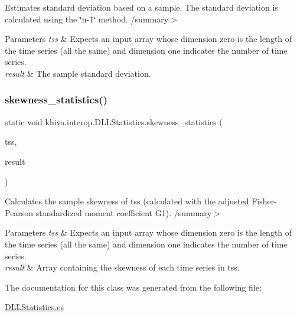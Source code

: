 Estimates standard deviation based on a sample. The standard deviation is calculated using the \char`\"{}n-\/1\char`\"{} method. /summary$>$ 
\begin{DoxyParams}{Parameters}
{\em tss} & Expects an input array whose dimension zero is the length of the time series (all the same) and dimension one indicates the number of time series.\\
\hline
{\em result} & The sample standard deviation.\\
\hline
\end{DoxyParams}


\mbox{\label{classkhiva_1_1interop_1_1_d_l_l_statistics_a8b1aee0f04bf7185e91460e4b861f8eb}} 
\subsubsection{\texorpdfstring{skewness\+\_\+statistics()}{skewness\_statistics()}}
{\footnotesize\ttfamily static void khiva.\+interop.\+D\+L\+L\+Statistics.\+skewness\+\_\+statistics (\begin{DoxyParamCaption}\item[{\mbox{[}\+In\mbox{]} ref Int\+Ptr}]{tss,  }\item[{\mbox{[}\+Out\mbox{]} out Int\+Ptr}]{result }\end{DoxyParamCaption})\hspace{0.3cm}{\ttfamily [static]}}



Calculates the sample skewness of tss (calculated with the adjusted Fisher-\/\+Pearson standardized moment coefficient G1). /summary$>$ 
\begin{DoxyParams}{Parameters}
{\em tss} & Expects an input array whose dimension zero is the length of the time series (all the same) and dimension one indicates the number of time series.\\
\hline
{\em result} & Array containing the skewness of each time series in tss.\\
\hline
\end{DoxyParams}




The documentation for this class was generated from the following file\+:\begin{DoxyCompactItemize}
\item 
\mbox{\hyperlink{_d_l_l_statistics_8cs}{D\+L\+L\+Statistics.\+cs}}\end{DoxyCompactItemize}
